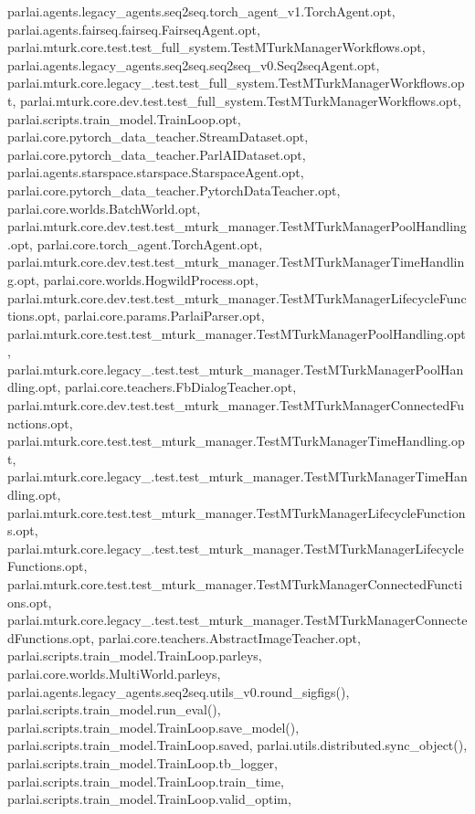 parlai.\+agents.\+legacy\+\_\+agents.\+seq2seq.\+torch\+\_\+agent\+\_\+v1.\+Torch\+Agent.\+opt, parlai.\+agents.\+fairseq.\+fairseq.\+Fairseq\+Agent.\+opt, parlai.\+mturk.\+core.\+test.\+test\+\_\+full\+\_\+system.\+Test\+M\+Turk\+Manager\+Workflows.\+opt, parlai.\+agents.\+legacy\+\_\+agents.\+seq2seq.\+seq2seq\+\_\+v0.\+Seq2seq\+Agent.\+opt, parlai.\+mturk.\+core.\+legacy\+\_.\+test.\+test\+\_\+full\+\_\+system.\+Test\+M\+Turk\+Manager\+Workflows.\+opt, parlai.\+mturk.\+core.\+dev.\+test.\+test\+\_\+full\+\_\+system.\+Test\+M\+Turk\+Manager\+Workflows.\+opt, parlai.\+scripts.\+train\+\_\+model.\+Train\+Loop.\+opt, parlai.\+core.\+pytorch\+\_\+data\+\_\+teacher.\+Stream\+Dataset.\+opt, parlai.\+core.\+pytorch\+\_\+data\+\_\+teacher.\+Parl\+A\+I\+Dataset.\+opt, parlai.\+agents.\+starspace.\+starspace.\+Starspace\+Agent.\+opt, parlai.\+core.\+pytorch\+\_\+data\+\_\+teacher.\+Pytorch\+Data\+Teacher.\+opt, parlai.\+core.\+worlds.\+Batch\+World.\+opt, parlai.\+mturk.\+core.\+dev.\+test.\+test\+\_\+mturk\+\_\+manager.\+Test\+M\+Turk\+Manager\+Pool\+Handling.\+opt, parlai.\+core.\+torch\+\_\+agent.\+Torch\+Agent.\+opt, parlai.\+mturk.\+core.\+dev.\+test.\+test\+\_\+mturk\+\_\+manager.\+Test\+M\+Turk\+Manager\+Time\+Handling.\+opt, parlai.\+core.\+worlds.\+Hogwild\+Process.\+opt, parlai.\+mturk.\+core.\+dev.\+test.\+test\+\_\+mturk\+\_\+manager.\+Test\+M\+Turk\+Manager\+Lifecycle\+Functions.\+opt, parlai.\+core.\+params.\+Parlai\+Parser.\+opt, parlai.\+mturk.\+core.\+test.\+test\+\_\+mturk\+\_\+manager.\+Test\+M\+Turk\+Manager\+Pool\+Handling.\+opt, parlai.\+mturk.\+core.\+legacy\+\_.\+test.\+test\+\_\+mturk\+\_\+manager.\+Test\+M\+Turk\+Manager\+Pool\+Handling.\+opt, parlai.\+core.\+teachers.\+Fb\+Dialog\+Teacher.\+opt, parlai.\+mturk.\+core.\+dev.\+test.\+test\+\_\+mturk\+\_\+manager.\+Test\+M\+Turk\+Manager\+Connected\+Functions.\+opt, parlai.\+mturk.\+core.\+test.\+test\+\_\+mturk\+\_\+manager.\+Test\+M\+Turk\+Manager\+Time\+Handling.\+opt, parlai.\+mturk.\+core.\+legacy\+\_.\+test.\+test\+\_\+mturk\+\_\+manager.\+Test\+M\+Turk\+Manager\+Time\+Handling.\+opt, parlai.\+mturk.\+core.\+test.\+test\+\_\+mturk\+\_\+manager.\+Test\+M\+Turk\+Manager\+Lifecycle\+Functions.\+opt, parlai.\+mturk.\+core.\+legacy\+\_.\+test.\+test\+\_\+mturk\+\_\+manager.\+Test\+M\+Turk\+Manager\+Lifecycle\+Functions.\+opt, parlai.\+mturk.\+core.\+test.\+test\+\_\+mturk\+\_\+manager.\+Test\+M\+Turk\+Manager\+Connected\+Functions.\+opt, parlai.\+mturk.\+core.\+legacy\+\_.\+test.\+test\+\_\+mturk\+\_\+manager.\+Test\+M\+Turk\+Manager\+Connected\+Functions.\+opt, parlai.\+core.\+teachers.\+Abstract\+Image\+Teacher.\+opt, parlai.\+scripts.\+train\+\_\+model.\+Train\+Loop.\+parleys, parlai.\+core.\+worlds.\+Multi\+World.\+parleys, parlai.\+agents.\+legacy\+\_\+agents.\+seq2seq.\+utils\+\_\+v0.\+round\+\_\+sigfigs(), parlai.\+scripts.\+train\+\_\+model.\+run\+\_\+eval(), parlai.\+scripts.\+train\+\_\+model.\+Train\+Loop.\+save\+\_\+model(), parlai.\+scripts.\+train\+\_\+model.\+Train\+Loop.\+saved, parlai.\+utils.\+distributed.\+sync\+\_\+object(), parlai.\+scripts.\+train\+\_\+model.\+Train\+Loop.\+tb\+\_\+logger, parlai.\+scripts.\+train\+\_\+model.\+Train\+Loop.\+train\+\_\+time, parlai.\+scripts.\+train\+\_\+model.\+Train\+Loop.\+valid\+\_\+optim, 